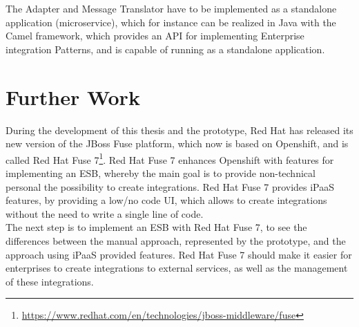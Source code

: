 The Adapter and Message Translator have to be implemented as a standalone application (microservice), which for instance can be realized in Java with the Camel framework, which provides an API for implementing Enterprise integration Patterns, and is capable of running as a standalone application. \\

\section{Further Work}
\label{sec:esbd-furhter-work}
During the development of this thesis and the prototype, Red Hat has released its new version of the JBoss Fuse platform, which now is based on Openshift, and is called Red Hat Fuse 7\footnote{\url{https://www.redhat.com/en/technologies/jboss-middleware/fuse}}. Red Hat Fuse 7 enhances Openshift with features for implementing an ESB, whereby the main goal is to provide non-technical personal the possibility to create integrations. Red Hat Fuse 7 provides iPaaS features, by providing a low/no code UI, which allows to create integrations without the need to write a single line of code. \\

The next step is to implement an ESB with Red Hat Fuse 7, to see the differences between the manual approach, represented by the prototype, and the approach using iPaaS provided features. Red Hat Fuse 7 should make it easier for enterprises to create integrations to external services, as well as the management of these integrations.   